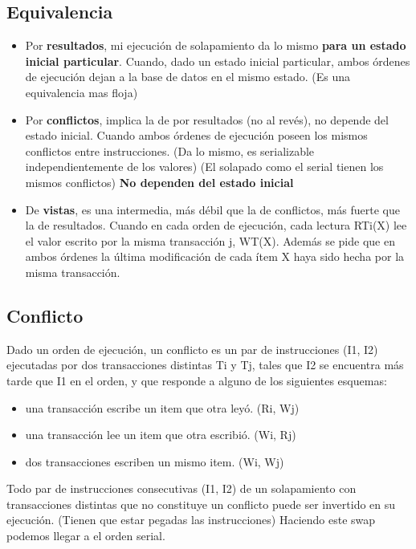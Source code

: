 \subsection*{Equivalencia}
\begin{itemize}
\item Por \textbf{resultados}, mi ejecución de solapamiento da lo mismo \textbf{para un estado inicial particular}.  Cuando, dado un estado inicial particular, ambos órdenes de ejecución dejan a la base de datos en el mismo estado. (Es una equivalencia mas floja)
\item Por \textbf{conflictos}, implica la de por resultados (no al revés), no depende del estado inicial. Cuando ambos órdenes de ejecución poseen los mismos conflictos entre instrucciones. (Da lo mismo, es serializable independientemente de los valores) (El solapado como el serial tienen los mismos conflictos) \textbf{No dependen del estado inicial}
\item De \textbf{vistas}, es una intermedia, más débil que la de conflictos, más fuerte que la de resultados. Cuando en cada orden de ejecución, cada lectura RTi(X) lee el valor escrito por la misma transacción j, WT(X). Además se pide que en ambos órdenes la última modificación de cada ítem X haya sido hecha por la misma transacción.
\end{itemize}


\subsection*{Conflicto}
Dado un orden de ejecución, un conflicto es un par de instrucciones (I1, I2) ejecutadas por dos transacciones distintas Ti y Tj, tales que I2 se encuentra más tarde que I1 en el orden, y que responde a alguno de los siguientes esquemas:
\begin{itemize}
\item una transacción escribe un item que otra leyó. (Ri, Wj)
\item una transacción lee un item que otra escribió. (Wi, Rj)
\item dos transacciones escriben un mismo item. (Wi, Wj)
\end{itemize}

Todo par de instrucciones consecutivas (I1, I2) de un solapamiento con transacciones distintas que no constituye un conflicto puede ser invertido en su ejecución. (Tienen que estar pegadas las instrucciones) Haciendo este swap podemos llegar a el orden serial.

